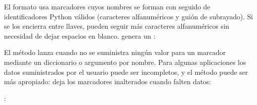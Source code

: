 \documentclass[a4,10pt,spanish]{sphinxmanual}
\begin{document}
\sphinxAtStartPar
El formato usa marcadores cuyos nombres se forman con \sphinxcode{\sphinxupquote{\$}} seguido de identificadores Python válidos (caracteres alfanuméricos y guión de subrayado). Si se los encierra entre llaves, pueden seguir más caracteres alfanuméricos sin necesidad de dejar espacios en blanco. \sphinxcode{\sphinxupquote{\$\$}} genera un \sphinxcode{\sphinxupquote{\$}}:

\begin{sphinxVerbatim}[commandchars=\\\{\}]
   
  
 
\end{sphinxVerbatim}

\sphinxAtStartPar
El método  lanza  cuando no se suministra ningún valor para un marcador mediante un diccionario o argumento por nombre.  Para algunas aplicaciones los datos suministrados por el usuario puede ser incompletos, y el método  puede ser más apropiado: deja los marcadores inalterados cuando falten datos:

\begin{sphinxVerbatim}[commandchars=\\\{\}]
  
  
: 
\end{sphinxVerbatim}
\end{document}
